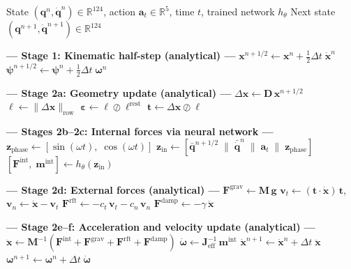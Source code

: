 \documentclass[11pt]{article}
\newcommand{\vect}[1]{\mathbf{#1}}
\newcommand{\mat}[1]{\mathbf{#1}}
\newcommand{\Real}{\mathbb{R}}
\begin{document}
\begin{algorithm}[H]
\caption{KNODE-Cosserat Hybrid Verlet Substep}
\label{alg:hybrid-substep}
\begin{algorithmic}[1]
\Require State $(\vect{q}^n, \dot{\vect{q}}^n) \in \Real^{124}$, action $\vect{a}_t \in \Real^5$, time $t$, trained network $h_\theta$
\Ensure Next state $(\vect{q}^{n+1}, \dot{\vect{q}}^{n+1}) \in \Real^{124}$

\Statex \textcolor{physicsblue}{\textbf{--- Stage 1: Kinematic half-step (analytical) ---}}
\State $\vect{x}^{n+1/2} \gets \vect{x}^n + \tfrac{1}{2}\Delta t\;\dot{\vect{x}}^n$ 
\State $\bm{\psi}^{n+1/2} \gets \bm{\psi}^n + \tfrac{1}{2}\Delta t\;\bm{\omega}^n$ 

\Statex
\Statex \textcolor{physicsblue}{\textbf{--- Stage 2a: Geometry update (analytical) ---}}
\State $\Delta\vect{x} \gets \mat{D}\,\vect{x}^{n+1/2}$ 
\State $\bm{\ell} \gets \|\Delta\vect{x}\|_{\text{row}}$ 
\State $\bm{\varepsilon} \gets \bm{\ell} \oslash \bm{\ell}^{\text{rest}}$ 
\State $\vect{t} \gets \Delta\vect{x} \oslash \bm{\ell}$ 

\Statex
\Statex \textcolor{nngreen}{\textbf{--- Stages 2b--2c: Internal forces via neural network ---}}
\State $\vect{z}_{\text{phase}} \gets [\sin(\omega t),\; \cos(\omega t)]$ 
\State $\vect{z}_{\text{in}} \gets [\bar{\vect{q}}^{n+1/2} \;\|\; \bar{\dot{\vect{q}}}^n \;\|\; \vect{a}_t \;\|\; \vect{z}_{\text{phase}}]$ 
\State $[\vect{F}^{\text{int}},\; \vect{m}^{\text{int}}] \gets h_\theta(\vect{z}_{\text{in}})$ \Comment{$\Real^{131} \to \Real^{62}$}

\Statex
\Statex \textcolor{physicsblue}{\textbf{--- Stage 2d: External forces (analytical) ---}}
\State $\vect{F}^{\text{grav}} \gets \mat{M}\,\vect{g}$ 
\State $\vect{v}_t \gets (\vect{t} \cdot \dot{\vect{x}})\,\vect{t}$, \quad $\vect{v}_n \gets \dot{\vect{x}} - \vect{v}_t$ 
\State $\vect{F}^{\text{rft}} \gets -c_t\,\vect{v}_t - c_n\,\vect{v}_n$ 
\State $\vect{F}^{\text{damp}} \gets -\gamma\,\dot{\vect{x}}$ 

\Statex
\Statex \textcolor{physicsblue}{\textbf{--- Stage 2e--f: Acceleration and velocity update (analytical) ---}}
\State $\ddot{\vect{x}} \gets \mat{M}^{-1}(\vect{F}^{\text{int}} + \vect{F}^{\text{grav}} + \vect{F}^{\text{rft}} + \vect{F}^{\text{damp}})$
\State $\dot{\bm{\omega}} \gets \mat{J}^{-1}_{\text{eff}}\,\vect{m}^{\text{int}}$ 
\State $\dot{\vect{x}}^{n+1} \gets \dot{\vect{x}}^n + \Delta t\;\ddot{\vect{x}}$
\State $\bm{\omega}^{n+1} \gets \bm{\omega}^n + \Delta t\;\dot{\bm{\omega}}$


\end{algorithmic}
\end{algorithm}
\end{document}

